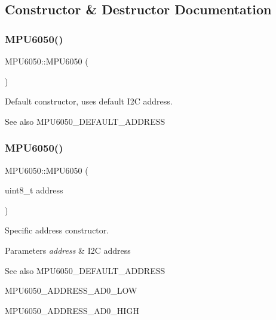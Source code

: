 \subsection{Constructor \& Destructor Documentation}
\mbox{\label{class_m_p_u6050_a7c0146d45537e4bd7a0d4c1c476fdab7}} 
\subsubsection{\texorpdfstring{MPU6050()}{MPU6050()}\hspace{0.1cm}{\footnotesize\ttfamily [1/2]}}
{\footnotesize\ttfamily M\+P\+U6050\+::\+M\+P\+U6050 (\begin{DoxyParamCaption}{ }\end{DoxyParamCaption})}

Default constructor, uses default I2C address. \begin{DoxySeeAlso}{See also}
M\+P\+U6050\+\_\+\+D\+E\+F\+A\+U\+L\+T\+\_\+\+A\+D\+D\+R\+E\+SS 
\end{DoxySeeAlso}
\mbox{\label{class_m_p_u6050_a94df4ec1565317ba5279122b3bf7e056}} 
\subsubsection{\texorpdfstring{MPU6050()}{MPU6050()}\hspace{0.1cm}{\footnotesize\ttfamily [2/2]}}
{\footnotesize\ttfamily M\+P\+U6050\+::\+M\+P\+U6050 (\begin{DoxyParamCaption}\item[{uint8\+\_\+t}]{address }\end{DoxyParamCaption})}

Specific address constructor. 
\begin{DoxyParams}{Parameters}
{\em address} & I2C address \\
\hline
\end{DoxyParams}
\begin{DoxySeeAlso}{See also}
M\+P\+U6050\+\_\+\+D\+E\+F\+A\+U\+L\+T\+\_\+\+A\+D\+D\+R\+E\+SS 

M\+P\+U6050\+\_\+\+A\+D\+D\+R\+E\+S\+S\+\_\+\+A\+D0\+\_\+\+L\+OW 

M\+P\+U6050\+\_\+\+A\+D\+D\+R\+E\+S\+S\+\_\+\+A\+D0\+\_\+\+H\+I\+GH 
\end{DoxySeeAlso}


